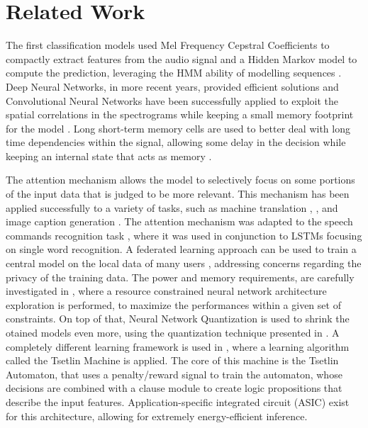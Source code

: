 
\section{Related Work}
\label{sec:related_work}

The first classification models used Mel Frequency Cepstral Coefficients to
compactly extract features from the audio signal and a Hidden Markov model to
compute the prediction, leveraging the HMM ability of modelling sequences
\cite{mfcchmm103088}.
Deep Neural Networks, in more recent years, provided efficient solutions
\cite{chensmallDNN} and Convolutional Neural Networks have been successfully
applied to exploit the spatial correlations in the spectrograms while keeping a
small memory footprint for the model \cite{sainathconvolutional}.
Long short-term memory cells are used to better deal with long time
dependencies within the signal, allowing some delay in the decision while
keeping an internal state that acts as memory \cite{fernandezRNNKWS}.

The attention mechanism allows the model to selectively focus on some portions
of the input data that is judged to be more relevant.
This mechanism has been applied successfully to a variety of tasks, such as
machine translation \cite{luong2015effective}, \cite{bahdanau2016neural}, and
image caption generation \cite{xu2016show}.
The attention mechanism was adapted to the speech commands recognition task
\cite{2018arXiv180808929C}, where it was used in conjunction to LSTMs focusing
on single word recognition.
A federated learning approach can be used to train a central model on the local
data of many users \cite{leroy2019federated}, addressing concerns regarding the
privacy of the training data.
The power and memory requirements, are carefully investigated in
\cite{zhang2018hello}, where a resource constrained neural network architecture
exploration is performed, to maximize the performances within a given set of
constraints. On top of that, Neural Network Quantization is used to shrink the
otained models even more, using the quantization technique presented in
\cite{10.1145/2847263.2847265}.
A completely different learning framework is used in \cite{granmo2021tsetlin},
where a learning algorithm called the Tsetlin Machine is applied.
The core of this machine is the Tsetlin Automaton,
that uses a penalty/reward signal to train the automaton, whose decisions are
combined with a clause module to create logic propositions that describe the 
input features.
Application-specific integrated circuit (ASIC) exist for this architecture,
allowing for extremely energy-efficient inference.



